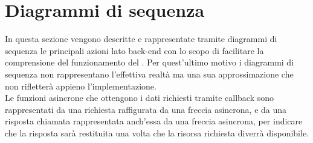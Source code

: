 \section{Diagrammi di sequenza}
In questa sezione vengono descritte e rappresentate tramite diagrammi di sequenza  le principali azioni lato back-end con lo scopo di facilitare la comprensione del funzionamento del . Per quest'ultimo motivo i diagrammi di sequenza non rappresentano l'effettiva realtà ma una sua approssimazione che non rifletterà appieno l'implementazione.\\
Le funzioni asincrone che ottengono i dati richiesti tramite callback sono rappresentati da una richiesta raffigurata da una freccia asincrona, e da una risposta chiamata  rappresentata anch'essa da una freccia asincrona, per indicare che la risposta sarà restituita una volta che la risorsa richiesta diverrà disponibile.

